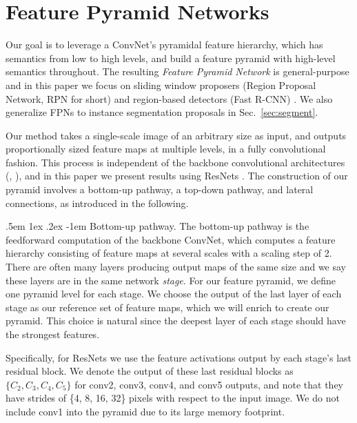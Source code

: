 \documentclass[10pt,twocolumn,letterpaper]{article}
\makeatletter
\renewcommand\paragraph{\@startsection{paragraph}{4}{\z@}%
  {.5em \@plus1ex \@minus.2ex}%
  {-1em}%
  {\normalfont\normalsize\bfseries}}
\makeatother
\begin{document}
\section{Feature Pyramid Networks}
\label{sec:fpn}

Our goal is to leverage a ConvNet's pyramidal feature hierarchy, which has semantics from low to high levels, and build a feature pyramid with high-level semantics throughout.
The resulting \emph{Feature Pyramid Network} is general-purpose and in this paper we focus on sliding window proposers (Region Proposal Network, RPN for short) \cite{Ren2015a} and region-based detectors (Fast R-CNN) \cite{Girshick2015a}.
We also generalize FPNs to instance segmentation proposals in Sec.~\ref{sec:segment}.

Our method takes a single-scale image of an arbitrary size as input, and outputs proportionally sized feature maps at multiple levels, in a fully convolutional fashion.
This process is independent of the backbone convolutional architectures (\eg, \cite{Krizhevsky2012,Simonyan2015,He2016}), and in this paper we present results using ResNets \cite{He2016}.
The construction of our pyramid involves a bottom-up pathway, a top-down pathway, and lateral connections, as introduced in the following.

\paragraph{Bottom-up pathway.}
The bottom-up pathway is the feedforward computation of the backbone ConvNet, which computes a feature hierarchy consisting of feature maps at several scales with a scaling step of 2.
There are often many layers producing output maps of the same size and we say these layers are in the same network \emph{stage}.
For our feature pyramid, we define one pyramid level for each stage.
We choose the output of the last layer of each stage as our reference set of feature maps, which we will enrich to create our pyramid.
This choice is natural since the deepest layer of each stage should have the strongest features.

Specifically, for ResNets \cite{He2016} we use the feature activations output by each stage's last residual block.
We denote the output of these last residual blocks as $\{C_2, C_3, C_4, C_5\}$ for conv2, conv3, conv4, and conv5 outputs, and note that they have strides of \{4, 8, 16, 32\} pixels with respect to the input image.
We do not include conv1 into the pyramid due to its large memory footprint.
\end{document}
